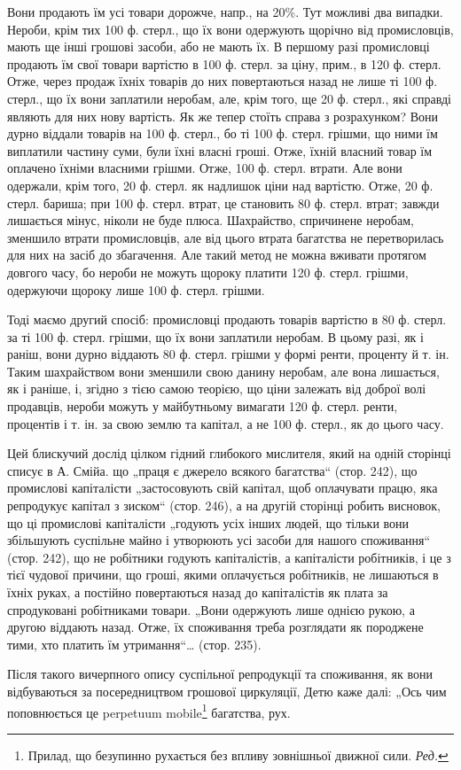 \parcont{}  %
Вони продають їм усі товари дорожче, напр., на 20\%. Тут можливі два випадки. Нероби, крім
тих 100 ф. стерл., що їх вони одержують щорічно від промисловців, мають ще інші грошові засоби, або
не мають їх. В першому разі промисловці продають їм свої товари вартістю в 100 ф. стерл. за ціну,
прим., в 120 ф. стерл. Отже, через продаж їхніх товарів до них повертаються назад не лише ті 100 ф.
стерл., що їх вони заплатили неробам, але, крім того, ще 20 ф. стерл., які справді являють для них
нову вартість. Як же тепер стоїть справа з розрахунком? Вони дурно віддали товарів на 100 ф. стерл.,
бо ті 100 ф. стерл. грішми, що ними їм виплатили частину суми, були їхні власні гроші. Отже, їхній
власний товар їм оплачено їхніми власними грішми. Отже, 100 ф. стерл. втрати. Але вони одержали,
крім того, 20 ф. стерл. як надлишок ціни над вартістю. Отже, 20 ф. стерл. бариша; при 100 ф. стерл.
втрат, це становить 80 ф. стерл. втрат; завжди лишається мінус, ніколи не буде плюса. Шахрайство,
спричинене неробам, зменшило втрати промисловців, але від цього втрата багатства не перетворилась
для них на засіб до збагачення. Але такий метод не можна вживати протягом довгого часу, бо нероби не
можуть щороку платити 120 ф. стерл. грішми, одержуючи щороку лише 100 ф. стерл. грішми.

Тоді маємо другий спосіб: промисловці продають товарів вартістю в 80 ф. стерл. за ті 100 ф. стерл.
грішми, що їх вони заплатили неробам. В цьому разі, як і раніш, вони дурно віддають 80 ф. стерл.
грішми у формі ренти, проценту й т. ін. Таким шахрайством вони зменшили свою данину неробам, але
вона лишається, як і раніше, і, згідно з тією самою теорією, що ціни залежать від доброї волі
продавців, нероби можуть у майбутньому вимагати 120 ф. стерл. ренти, процентів і т. ін. за свою
землю та капітал, а не 100 ф. стерл., як до цього часу.

Цей блискучий дослід цілком гідний глибокого мислителя, який на одній сторінці списує в А. Смійа. що
„праця є джерело всякого багатства“ (стор. 242), що промислові капіталісти „застосовують свій
капітал, щоб оплачувати працю, яка репродукує капітал з зиском“ (стор. 246), а на другій сторінці
робить висновок, що ці промислові капіталісти „годують
усіх інших людей, що тільки вони збільшують суспільне майно і утворюють усі засоби для нашого
споживання“ (стор. 242), що не робітники годують капіталістів, а капіталісти робітників, і це з тієї
чудової причини, що гроші, якими оплачується робітників, не лишаються в їхніх руках, а постійно
повертаються назад до капіталістів як плата за спродуковані робітниками товари. „Вони одержують лише
однією рукою, а другою віддають назад. Отже, їх споживання треба розглядати як породжене тими, хто
платить їм утримання“\dots{} (стор. 235).

Після такого вичерпного опису суспільної репродукції та споживання, як вони відбуваються за
посередництвом грошової циркуляції, Детю каже далі: „Ось чим поповнюється це perpetuum mobile\footnote*{Прилад, що безупинно рухається без впливу зовнішньої движної сили. \emph{Ред.}}
багатства, рух.
\parbreak{}  %
